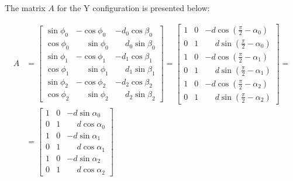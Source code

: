 \documentclass[11pt,a4paper]{article}
\begin{document}
The matrix \(A\) for the Y configuration is presented below:

\begin{equation}
    \begin{aligned}
        A & = \begin{bmatrix}
                  \sin\phi_0 & -\cos\phi_0           & -d_0\cos\beta_0           \\
                  \cos\phi_0 & \phantom{-}\sin\phi_0 & \phantom{-}d_0\sin\beta_0 \\
                  \sin\phi_1 & -\cos\phi_1           & -d_1\cos\beta_1           \\
                  \cos\phi_1 & \phantom{-}\sin\phi_1 & \phantom{-}d_1\sin\beta_1 \\
                  \sin\phi_2 & -\cos\phi_2           & -d_2\cos\beta_2           \\
                  \cos\phi_2 & \phantom{-}\sin\phi_2 & \phantom{-}d_2\sin\beta_2
              \end{bmatrix} = \begin{bmatrix}
                                  1 & 0 & -d\cos\left(\frac{\pi}{2} - \alpha_0\right)           \\
                                  0 & 1 & \phantom{-}d\sin\left(\frac{\pi}{2} - \alpha_0\right) \\
                                  1 & 0 & -d\cos\left(\frac{\pi}{2} - \alpha_1\right)           \\
                                  0 & 1 & \phantom{-}d\sin\left(\frac{\pi}{2} - \alpha_1\right) \\
                                  1 & 0 & -d\cos\left(\frac{\pi}{2} - \alpha_2\right)           \\
                                  0 & 1 & \phantom{-}d\sin\left(\frac{\pi}{2} - \alpha_2\right)
                              \end{bmatrix}  = \\
          & = \begin{bmatrix}
                  1 & 0 & -d\sin\alpha_0           \\
                  0 & 1 & \phantom{-}d\cos\alpha_0 \\
                  1 & 0 & -d\sin\alpha_1           \\
                  0 & 1 & \phantom{-}d\cos\alpha_1 \\
                  1 & 0 & -d\sin\alpha_2           \\
                  0 & 1 & \phantom{-}d\cos\alpha_2

\end{bmatrix}
\end{aligned}
\end{equation}
\end{document}
